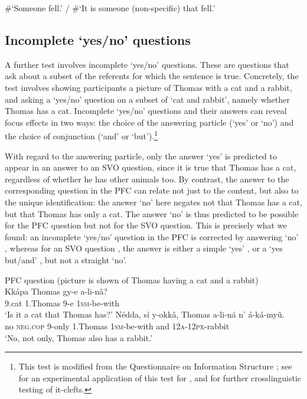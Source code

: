 \documentclass[output=paper]{langsci/langscibook}
\begin{document}
\glt     \#‘Someone fell.’ / \#‘It is someone (non-specific) that fell.’
\z
\z

\subsection{Incomplete ‘yes/no’ questions}\label{sec:vanderwal:3.3} %

A further test involves incomplete ‘yes/no’ questions. These are questions that ask about a subset of the referents for which the sentence is true. Concretely, the test involves showing participants a picture of Thomas with a cat and a rabbit, and asking a ‘yes/no’ question on a subset of ‘cat and rabbit’, namely whether Thomas has a cat. Incomplete ‘yes/no’ questions and their answers can reveal focus effects in two ways: the choice of the answering particle (‘yes’ or ‘no’) and the choice of conjunction (‘and’ or ‘but’).\footnote{This test is modified from the Questionnaire on Information Structure \citep{SkopeteasEtAl2006}; see \citet{OneaBeaver2011} for an experimental application of this test for , and \citet{DestruelEtAl2015} for further crosslinguistic testing of it-clefts.}

  With regard to the answering particle, only the answer ‘yes’ is predicted to appear in an answer to an SVO question, since it is true that Thomas has a cat, regardless of whether he has other animals too. By contrast, the answer to the corresponding question in the PFC can relate not just to the content, but also to the unique identification: the answer ‘no’ here negates not that Thomas has a cat, but that Thomas has only a cat. The answer ‘no’ is thus predicted to be possible for the PFC question but not for the SVO question. This is precisely what we found: an incomplete ‘yes/no’ question in the PFC  is corrected by answering ‘no’ , whereas for an SVO question , the answer is either a simple ‘yes’ , or a ‘yes but/and’ , but not a straight ‘no’. 

\newpage

\ea\label{ex:vanderwal:16}PFC question
       (picture is shown of Thomas having a cat and a rabbit)\\
\ea\label{ex:vanderwal:16a}
\gll     Kkápa  Thomas  gy-e  a-li-nâ?\\
         9.cat  1.Thomas  9-e  \textsc{1sm}-be-with\\
\glt     ‘Is it a cat that Thomas has?’
\ex\label{ex:vanderwal:16b}
\gll      Nédda,  sí    y-okkâ,  Thomas  a-li-ná    n’  á-ká-myû.\\
         no  \textsc{neg}.\textsc{cop}  9-only  1.Thomas  \textsc{1sm}-be-with  and  \textsc{12a}-\textsc{12px}-rabbit\\
\glt     ‘No, not only, Thomas also has a rabbit.’
\z
\z
\end{document}
